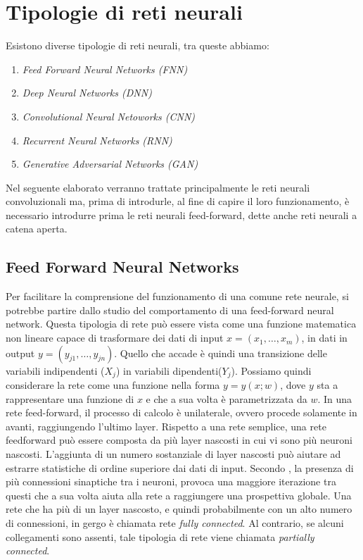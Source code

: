 \section{Tipologie di reti neurali}
Esistono diverse tipologie di reti neurali, tra queste abbiamo:
\begin{enumerate}
    \item \emph{Feed Forward Neural Networks (FNN)}
    \item \emph{Deep Neural Networks (DNN)}
    \item \emph{Convolutional Neural Netoworks (CNN)}
    \item \emph{Recurrent Neural Networks (RNN)}
    \item \emph{Generative Adversarial Networks (GAN)}
\end{enumerate}
Nel seguente elaborato verranno trattate principalmente le reti neurali convoluzionali 
ma, prima di introdurle, al fine di capire il loro funzionamento, è necessario 
introdurre prima le reti neurali feed-forward, dette anche reti neurali a catena 
aperta.

\subsection{Feed Forward Neural Networks}
Per facilitare la comprensione del funzionamento di una comune rete neurale, 
si potrebbe partire dallo studio del comportamento di una feed-forward neural 
network. Questa tipologia di rete può essere vista come una funzione matematica 
non lineare capace di trasformare dei dati di input $x=(x_1, \dots, x_m)$, in dati in 
output $y=(y_{j1}, \dots, y_{jn})$. Quello che accade è quindi una transizione delle variabili 
indipendenti ($X_j$) in variabili dipendenti($Y_j$). Possiamo quindi considerare la 
rete come una funzione nella forma $y = y(x;w)$, dove $y$ sta a rappresentare una funzione di $x$ 
e che a sua volta è parametrizzata da $w$. In una rete feed-forward, il 
processo di calcolo è unilaterale, ovvero procede solamente in avanti, raggiungendo 
l'ultimo layer. Rispetto a una rete semplice, una rete feedforward può essere 
composta da più layer nascosti in cui vi sono più neuroni nascosti. L'aggiunta 
di un numero sostanziale di layer nascosti può aiutare ad estrarre statistiche di 
ordine superiore dai dati di input. Secondo \cite{04}, la presenza di più connessioni 
sinaptiche tra i neuroni, provoca una maggiore iterazione tra questi che a sua 
volta aiuta alla rete a raggiungere una prospettiva globale. Una rete che ha più di 
un layer nascosto, e quindi probabilmente con un alto numero di connessioni, in 
gergo è chiamata rete \emph{fully connected}. Al contrario, se alcuni collegamenti sono 
assenti, tale tipologia di rete viene chiamata \emph{partially connected}.

